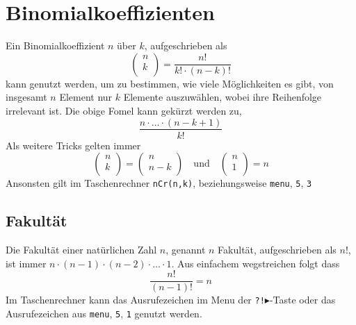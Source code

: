 \documentclass{article}
\begin{document}
 
\newcommand{\bink}[2]{
\begin{pmatrix}
 #1 \\
 #2 \\
\end{pmatrix} 
} 
 
\section{Binomialkoeffizienten}  
Ein Binomialkoeffizient $n$ über $k$, aufgeschrieben als
\[ 
\bink{n}{k} 
= \frac{n!}{k! \cdot (n-k)!} 
\]
kann genutzt werden, um zu bestimmen, wie viele Möglichkeiten es gibt, von insgesamt $n$ Element nur $k$ Elemente auszuwählen, wobei ihre Reihenfolge irrelevant ist. Die obige Fomel kann gekürzt werden zu,
\[
 \frac{n \cdot \ldots \cdot (n-k+1)}{k!}
\]  
Als weitere Tricks gelten immer
\[
\bink{n}{k} = \bink{n}{n-k}
\quad \text{und} \quad
\bink{n}{1} = n 
\]
Ansonsten gilt im Taschenrechner \texttt{nCr(n,k)}, beziehungsweise \texttt{menu}, \texttt{5}, \texttt{3} 
 
\subsection{Fakultät}
Die Fakultät einer natürlichen Zahl $n$, genannt $n$ Fakultät, aufgeschrieben als $n!$, ist immer $n \cdot (n-1) \cdot (n-2) \cdot \ldots \cdot 1$. Aus einfachem wegstreichen folgt dass
\[
 \frac{n!}{(n-1)!} = n
\]
Im Taschenrechner kann das Ausrufezeichen im Menu der \texttt{?!$\blacktriangleright$}-Taste oder das Ausrufezeichen aus \texttt{menu}, \texttt{5}, \texttt{1} genutzt werden. 
\end{document}
